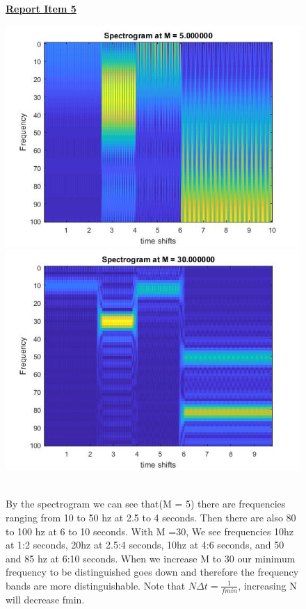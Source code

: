 \documentclass{article}
\begin{document}
\begin{figure}[H]
\color{red}
\underline{\textbf{Report Item 5}}
\color{black}

\includegraphics[scale = .5]{report5}
\includegraphics[scale = .5]{report5_2}
\end{figure}
\begin{figure}[H]
\\By the spectrogram we can see that(M = 5) there are frequencies ranging from 10 to 50 hz at 2.5 to 4 seconds. Then there are also 80 to 100 hz at 6 to 10 seconds. With M =30, We see frequencies 10hz at 1:2 seconds, 20hz at 2.5:4 seconds, 10hz at 4:6 seconds, and 50 and 85 hz at 6:10 seconds. When we increase M to 30 our minimum frequency to be distinguished goes down and therefore the frequency bands are more distinguishable. Note that $N\Delta t = \frac{1}{fmin}$, increasing N will decrease fmin.
\end{figure}
\end{document}
